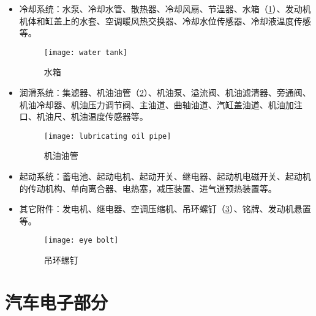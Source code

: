 \documentclass[UTF8]{ctexart}
\numberwithin{figure}{section}
\numberwithin{table}{section}
\begin{document}
\begin{itemize}
	\item 冷却系统：水泵、冷却水管、散热器、冷却风扇、节温器、水箱（\cref{water tank}）、发动机机体和缸盖上的水套、空调暖风热交换器、冷却水位传感器、冷却液温度传感等。

	      \begin{figure}[htbp]
		      \centering
		      \begin{minipage}[b]{0.5\textwidth}
			      \centering
			      \texttt{[image: water tank]}
			      \caption{水箱}
			      \label{water tank}
		      \end{minipage}
	      \end{figure}

	\item 润滑系统：集滤器、机油油管（\cref{lubricating oil pipe}）、机油泵、溢流阀、机油滤清器、旁通阀、机油冷却器、机油压力调节阀、主油道、曲轴油道、汽缸盖油道、机油加注口、机油尺、机油温度传感器等。

	      \begin{figure}[htbp]
		      \centering
		      \begin{minipage}[b]{0.7\textwidth}
			      \centering
			      \texttt{[image: lubricating oil pipe]}
			      \caption{机油油管}
			      \label{lubricating oil pipe}
		      \end{minipage}
	      \end{figure}

	\item 起动系统：蓄电池、起动电机、起动开关、继电器、起动机电磁开关、起动机的传动机构、单向离合器、电热塞，减压装置、进气道预热装置等。

	\item 其它附件：发电机、继电器、空调压缩机、吊环螺钉（\cref{eye bolt}）、铭牌、发动机悬置等。

	      \begin{figure}[htbp]
		      \centering
		      \begin{minipage}[b]{0.5\textwidth}
			      \centering
			      \texttt{[image: eye bolt]}
			      \caption{吊环螺钉}
			      \label{eye bolt}
		      \end{minipage}
	      \end{figure}
\end{itemize}

\clearpage

\section{汽车电子部分}
\end{document}
